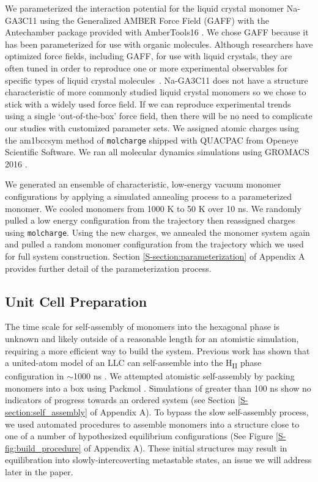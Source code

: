   We parameterized the interaction potential for the liquid crystal monomer
  Na-GA3C11 using the Generalized AMBER Force Field (GAFF)
  \cite{wang_development_2004} with the Antechamber package
  \cite{wang_automatic_2006} provided with AmberTools16
  \cite{case_ambertools16_2016}. We chose GAFF because it has been parameterized
  for use with organic molecules. Although researchers have optimized force
  fields, including GAFF, for use with liquid crystals, they are often tuned in 
  order to reproduce one or more experimental observables for specific types of
  liquid crystal molecules~\cite{cook_development_2001,boyd_optimization_2015}.
  Na-GA3C11 does not have a structure characteristic of more commonly studied 
  liquid crystal monomers so we chose to stick with a widely used force field.
  If we can reproduce experimental trends using a single `out-of-the-box' force
  field, then there will be no need to complicate our studies with customized
  parameter sets. We assigned atomic charges using the am1bccsym method of
  \texttt{molcharge} shipped with QUACPAC from Openeye Scientific Software. We
  ran all molecular dynamics simulations using GROMACS 2016
  \cite{bekker_gromacs:_1993,berendsen_gromacs:_1995,van_der_spoel_gromacs:_2005,hess_gromacs_2008}.

  We generated an ensemble of characteristic, low-energy vacuum monomer
  configurations by applying a simulated annealing process to a
  parameterized monomer. We cooled monomers from 1000 K to 50 K over 10
  ns. We randomly pulled a low energy configuration from the
  trajectory then reassigned charges using \texttt{molcharge}. Using the new
  charges, we annealed the monomer system again and pulled a random monomer
  configuration from the trajectory which we used for full system
  construction. Section \ref{S-section:parameterization} 
  of Appendix A provides further detail of the parameterization process.

  \subsection{Unit Cell Preparation}\label{method:unitcell_build}

  The time scale for self-assembly of monomers into the hexagonal phase is
  unknown and likely outside of a reasonable length for an atomistic simulation,
  requiring a more efficient way to build the system. Previous work has shown
  that a united-atom model of an LLC can self-assemble into the
  H\textsubscript{II} phase configuration in $\sim$1000 ns
  \cite{mondal_self-assembly_2013}. We attempted atomistic self-assembly by
  packing monomers into a box using Packmol \cite{martinez_packmol:_2009}.
  Simulations of greater than 100 ns show no indicators of progress towards an
  ordered system (see Section \ref{S-section:self_assembly} of Appendix A). To bypass
  the slow self-assembly process, we used automated procedures to
  assemble monomers into a structure close to one of a number of hypothesized
  equilibrium configurations (See Figure \ref{S-fig:build_procedure} of Appendix A).
  These initial structures may result in equilibration into slowly-intercoverting
  metastable states, an issue we will address later in the paper. 

